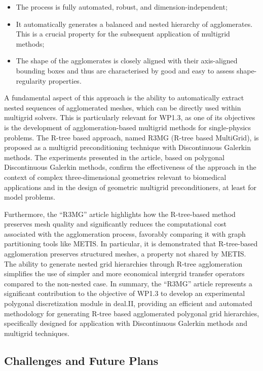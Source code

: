 \documentclass[a4paper,12pt]{article}
\begin{document}
\begin{itemize}
    \item 
    The process is fully automated, robust, and dimension-independent;
    \item It automatically generates a
balanced and nested hierarchy of agglomerates. This is a crucial property for
the subsequent application of multigrid methods;
\item The shape of the agglomerates is closely aligned with their axis-aligned bounding boxes and thus are characterised by good and easy to assess  shape-regularity properties.
\end{itemize}

A fundamental aspect of this approach is the ability to automatically extract
nested sequences of agglomerated meshes, which can be directly used within
multigrid solvers. This is particularly relevant for WP1.3, as one of its
objectives is the development of agglomeration-based multigrid methods for
single-physics problems. The R-tree based approach, named R3MG (R-tree based
MultiGrid), is proposed as a multigrid preconditioning technique with
Discontinuous Galerkin methods. The experiments presented in the article, based
on polygonal Discontinuous Galerkin methods, confirm the effectiveness of the
approach in the context of complex three-dimensional geometries relevant to biomedical applications and in the
design of geometric multigrid preconditioners, at least for model problems.

Furthermore, the ``R3MG'' article highlights how the R-tree-based method preserves
mesh quality and significantly reduces the computational cost associated with
the agglomeration process, favorably comparing it with graph partitioning tools
like METIS. In particular, it is demonstrated that R-tree-based agglomeration
preserves structured meshes, a property not shared by METIS. The ability to
generate nested grid hierarchies through R-tree agglomeration simplifies the use
of simpler and more economical intergrid transfer operators compared to the
non-nested case. In summary, the ``R3MG'' article represents a significant
contribution to the objective of WP1.3 to develop an experimental polygonal
discretization module in deal.II, providing an efficient and automated
methodology for generating R-tree based agglomerated polygonal grid hierarchies,
specifically designed for application with Discontinuous Galerkin methods and
multigrid techniques.



 \subsection{Challenges and Future Plans}
\end{document}
